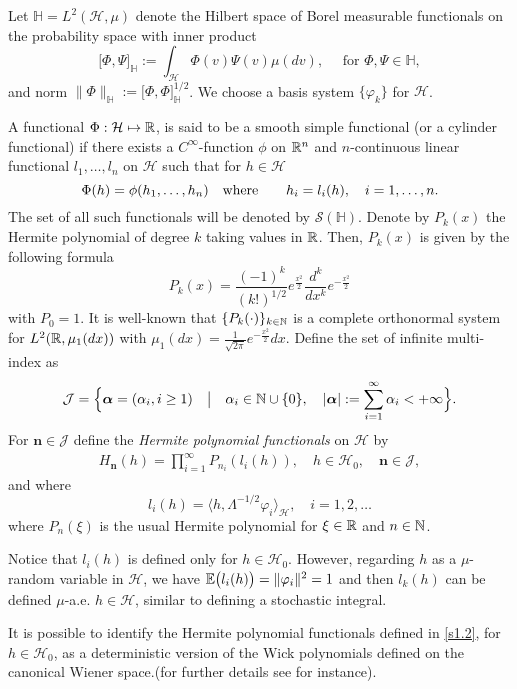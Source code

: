\documentclass[review, onefignum, onetabnum]{siamart171218}
\begin{document}
    Let
$
    \mathbb{H} = L^2 (\mathcal{H}, \mu)
$
denote the Hilbert space of Borel
measurable functionals on the probability space with inner
product
\[
    \big [ \Phi,\Psi\big ]_\mathbb{H}:=\int_{\mathcal{H}} \Phi(v)
    \Psi(v)\mu(dv),\quad
    \text{ for } \Phi,\Psi\in\mathbb{H},
\]
and norm $\|\Phi\|_{\mathbb{H}}:=\big [\Phi,\Phi\big ]_\mathbb{H}^{1/2}$.
We choose a basis system $\{\varphi_k\}$ for $\mathcal{H}$.

    A functional $\Phi:\mathcal{H}\mapsto {\mathbb R}$, is said to be a smooth simple
functional (or a cylinder functional) if there exists a
$C^\infty$-function $\phi$ on ${\mathbb R}^n$ and $n$-continuous linear functional
$l_1,\ldots,l_n$ on $\mathcal{H}$ such that for
$h\in\mathcal{H}$
\begin{equation}
    \Phi(h)=\phi(h_1,\ldots,h_n)\quad
    \mbox{\rm where}\qquad h_i=l_i(h),\quad i=1,\ldots,n.\label{S1.2}
\end{equation}
The set of all such functionals will be denoted by $\mathcal{S}(\mathbb{H})$.
%
Denote by $P_k(x)$ the Hermite polynomial of degree $k$ taking values in
${\mathbb R}$. Then, $P_k(x)$ is given by the following formula
\[
     P_k(x)=\frac{(-1)^k}{(k!)^{1/2}} e^{\tfrac{x^2}{2}}
     \frac{d^k}{dx^k}e^{-\tfrac{x^2}{2}}
\]
with $P_0=1$. It is well-known that $\{P_k(\cdot)\}_{k\in{\mathbb N}}$ is a complete
orthonormal system for $L^2({\mathbb R},\mu_1(dx))$ with
$
    \mu_1(dx) =
        \tfrac{1}{\sqrt{2\pi}}
        e^{-\tfrac{x^2}{2}} dx
$.
Define the set of infinite multi-index as
\[
    \mathcal{J}=\Big\{\bm{\alpha}=(\alpha_i,i\ge 1)\quad \big|\quad\alpha_i\in
    {\mathbb N}\cup\{0\},\quad |\bm{\alpha}|:=\sum_{i=1}^\infty
    \alpha_i<+\infty  \Big\}.
\]
For $\bm{n}\in\mathcal{J} $ define the {\it Hermite polynomial functionals}
on $\mathcal{H}$ by
\begin{align}
    \label{s1.2}
    H_{\bm{n}}(h) = \prod_{i=1}^\infty P_{n_i}(l_i(h)),\quad
    h \in \mathcal{H}_0, \quad \bm{n} \in \mathcal{J},
\end{align}
and where
\[
    l_i(h) = \langle h,  \Lambda^{-1/2} \varphi_i \rangle_\mathcal{H}, \quad
    i=1,2,\ldots
\]
where $P_n(\xi)$ is the usual Hermite polynomial for  $\xi\in{\mathbb R}$ and
$n\in{\mathbb N}$.
%
\begin{remark}
    Notice that $l_i(h)$ is defined only for $h \in\mathcal{H}_0$. However,
    regarding $h$ as a $\mu$-random variable in
    $\mathcal{H}$, we have $\mathbb{E}\big(l_i (h)\big) = \|\varphi_i \|^2  = 1$ and
    then $l_k (h)$ can be defined $\mu$-a.e. $h \in\mathcal{H}$,
    similar to defining a stochastic integral.

    It is possible to identify the Hermite polynomial functionals
    defined in \eqref{s1.2}, for $h \in\mathcal{H}_0$, as a deterministic
    version of the Wick polynomials defined on the canonical Wiener space.(for
    further details see \cite{im} for instance).
\end{remark}
\end{document}
